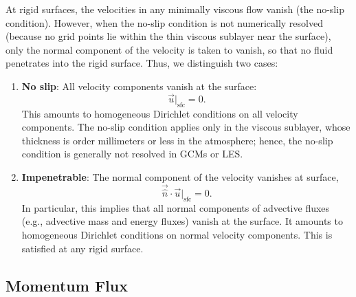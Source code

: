 \documentclass{report}
\begin{document}
At rigid surfaces, the velocities in any minimally viscous flow vanish (the no-slip condition). However, when the no-slip condition is not numerically resolved (because no grid points lie within the thin viscous sublayer near the surface), only the normal component of the velocity is taken to vanish, so that no fluid penetrates into the rigid surface. Thus, we distinguish two cases:
\begin{enumerate}
    \item \textbf{No slip}: All velocity components vanish at the surface:
    \[
    \vec{u}\bigl|_\mathrm{sfc} =  0.
    \]
    This amounts to homogeneous Dirichlet conditions on all velocity components. The no-slip condition applies only in the viscous sublayer, whose thickness is order millimeters or less in the atmosphere; hence, the no-slip condition is generally not resolved in GCMs or LES. 
    \item \textbf{Impenetrable}: The normal component of the velocity vanishes at surface,
    \[
    \vec{\hat n} \cdot \vec{u}\bigl|_\mathrm{sfc}  = 0.
    \]
    In particular, this implies that all normal components of advective fluxes (e.g., advective mass and energy fluxes) vanish at the surface. It amounts to homogeneous Dirichlet conditions on normal velocity components. This is satisfied at any rigid surface.
    
\end{enumerate}

\subsection{Momentum Flux}
\end{document}
